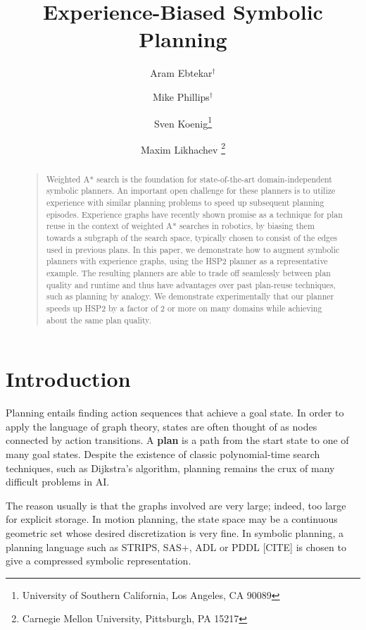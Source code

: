 \documentclass[letterpaper]{article}
\begin{document}
%
\title{Experience-Biased Symbolic Planning}
\author{Aram Ebtekar$^\dagger$ \and Mike Phillips$^\dagger$ \and Sven Koenig\thanks{University of Southern California, Los Angeles, CA 90089} \and Maxim Likhachev%
\thanks{Carnegie Mellon University, Pittsburgh, PA 15217}%
%
}
\maketitle
\begin{abstract}
\begin{quote}
Weighted A* search is the foundation for state-of-the-art domain-independent symbolic planners.
An important open challenge for these planners is to utilize experience with similar planning problems to speed up subsequent planning episodes.
Experience graphs have recently shown promise as a technique for plan reuse in the context of weighted A* searches in robotics, by biasing them towards a subgraph of the search space, typically chosen to consist of the edges used in previous plans.
In this paper, we demonstrate how to augment symbolic planners with
experience graphs, using the HSP2 planner as a representative
example.
The resulting planners are able to trade off seamlessly
between plan quality and runtime and thus have advantages over past
plan-reuse techniques, such as planning by analogy.
We demonstrate
experimentally that our planner speeds up HSP2 by a factor of 2 or more on
many domains while achieving about the same plan quality.
\end{quote}
\end{abstract}

\section{Introduction}
Planning entails finding action sequences that achieve a goal state.
In order to apply the language of graph theory, states are often thought of as nodes connected by action transitions.
A \textbf{plan} is a path from the start state to one of many goal states.
Despite the existence of classic polynomial-time search techniques, such as Dijkstra's algorithm, planning remains the crux of many difficult problems in AI.

The reason usually is that the graphs involved are very large; indeed, too large for explicit storage.
In motion planning, the state space may be a continuous geometric set whose desired discretization is very fine.
In symbolic planning, a planning language such as STRIPS, SAS+, ADL or PDDL [CITE] is chosen to give a compressed symbolic representation.
\end{document}
